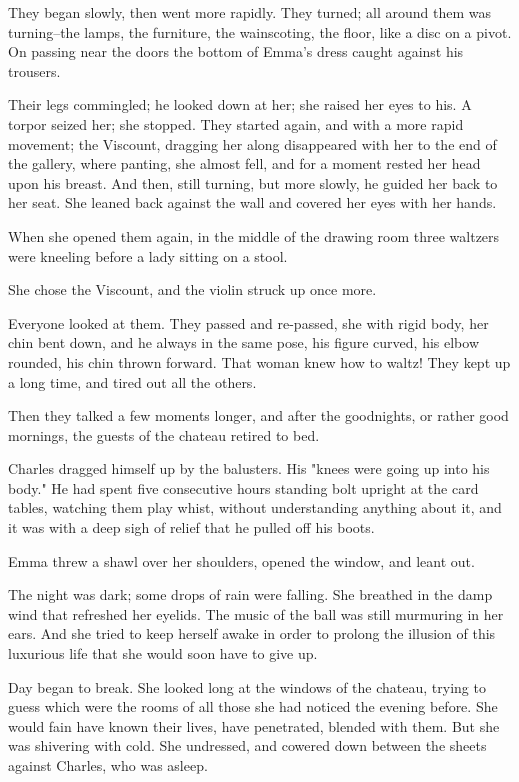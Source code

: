 \documentclass{tufte-book}
\begin{document}
They began slowly, then went more rapidly. They turned; all around them
was turning--the lamps, the furniture, the wainscoting, the floor, like
a disc on a pivot. On passing near the doors the bottom of Emma's dress
caught against his trousers.

Their legs commingled; he looked down at her; she raised her eyes to
his. A torpor seized her; she stopped. They started again, and with a
more rapid movement; the Viscount, dragging her along disappeared with
her to the end of the gallery, where panting, she almost fell, and for
a moment rested her head upon his breast. And then, still turning, but
more slowly, he guided her back to her seat. She leaned back against the
wall and covered her eyes with her hands.

When she opened them again, in the middle of the drawing room three
waltzers were kneeling before a lady sitting on a stool.

She chose the Viscount, and the violin struck up once more.

Everyone looked at them. They passed and re-passed, she with rigid body,
her chin bent down, and he always in the same pose, his figure curved,
his elbow rounded, his chin thrown forward. That woman knew how to
waltz! They kept up a long time, and tired out all the others.

Then they talked a few moments longer, and after the goodnights, or
rather good mornings, the guests of the chateau retired to bed.

Charles dragged himself up by the balusters. His "knees were going
up into his body." He had spent five consecutive hours standing
bolt upright at the card tables, watching them play whist, without
understanding anything about it, and it was with a deep sigh of relief
that he pulled off his boots.

Emma threw a shawl over her shoulders, opened the window, and leant out.

The night was dark; some drops of rain were falling. She breathed in the
damp wind that refreshed her eyelids. The music of the ball was still
murmuring in her ears. And she tried to keep herself awake in order to
prolong the illusion of this luxurious life that she would soon have to
give up.

Day began to break. She looked long at the windows of the chateau,
trying to guess which were the rooms of all those she had noticed the
evening before. She would fain have known their lives, have penetrated,
blended with them. But she was shivering with cold. She undressed, and
cowered down between the sheets against Charles, who was asleep.
\end{document}
